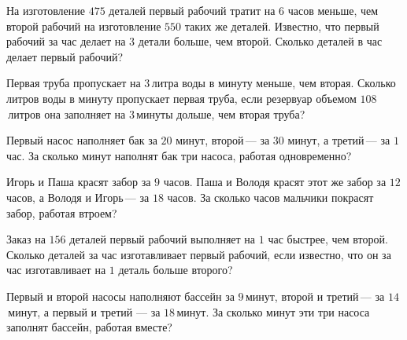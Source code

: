 \begin{class}[number=4]
\begin{listofex}
		\item На изготовление \(475\) деталей первый рабочий тратит на \(6\) часов меньше, чем второй рабочий на изготовление \(550\) таких же деталей. Известно, что первый рабочий за час делает на \(3\) детали больше, чем второй. Сколько деталей в час делает первый рабочий?
		\item Первая труба пропускает на \(3\) литра воды в минуту меньше, чем вторая. Сколько литров воды в минуту пропускает первая труба, если резервуар объемом \(108\) литров она заполняет на \(3\) минуты дольше, чем вторая труба?
		\item Первый насос наполняет бак за \(20\) минут, второй --- за \(30\) минут, а третий --- за \(1\) час. За сколько минут наполнят бак три насоса, работая одновременно?
		\item Игорь и Паша красят забор за \(9\) часов. Паша и Володя красят этот же забор за \(12\) часов, а Володя и Игорь --- за \(18\) часов. За сколько часов мальчики покрасят забор, работая втроем?
		\item Заказ на \(156\) деталей первый рабочий выполняет на \(1\) час быстрее, чем второй. Сколько деталей за час изготавливает первый рабочий, если известно, что он за час изготавливает на \(1\) деталь больше второго?
		\item Первый и второй насосы наполняют бассейн за \(9\) минут, второй и третий --- за \(14\) минут, а первый и третий --- за \(18\) минут. За сколько минут эти три насоса заполнят бассейн, работая вместе?
		
		
		
		
	\end{listofex}
\end{class}

